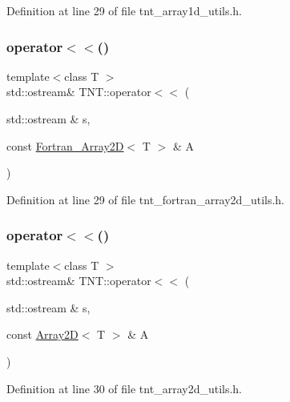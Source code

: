 Definition at line 29 of file tnt\+\_\+array1d\+\_\+utils.\+h.

\mbox{\label{namespaceTNT_a4b4db3071f96be25b2b8f58aa642e14b}} 
\subsubsection{\texorpdfstring{operator$<$$<$()}{operator<<()}\hspace{0.1cm}{\footnotesize\ttfamily [3/7]}}
{\footnotesize\ttfamily template$<$class T $>$ \\
std\+::ostream\& T\+N\+T\+::operator$<$$<$ (\begin{DoxyParamCaption}\item[{std\+::ostream \&}]{s,  }\item[{const \hyperlink{classTNT_1_1Fortran__Array2D}{Fortran\+\_\+\+Array2D}$<$ T $>$ \&}]{A }\end{DoxyParamCaption})}



Definition at line 29 of file tnt\+\_\+fortran\+\_\+array2d\+\_\+utils.\+h.

\mbox{\label{namespaceTNT_a016e1f9f0eb43642e6d41748b4dd1199}} 
\subsubsection{\texorpdfstring{operator$<$$<$()}{operator<<()}\hspace{0.1cm}{\footnotesize\ttfamily [4/7]}}
{\footnotesize\ttfamily template$<$class T $>$ \\
std\+::ostream\& T\+N\+T\+::operator$<$$<$ (\begin{DoxyParamCaption}\item[{std\+::ostream \&}]{s,  }\item[{const \hyperlink{classTNT_1_1Array2D}{Array2D}$<$ T $>$ \&}]{A }\end{DoxyParamCaption})}



Definition at line 30 of file tnt\+\_\+array2d\+\_\+utils.\+h.

\mbox{\label{namespaceTNT_a655b76bc5ba826ec55aebe56429c0d9c}} 
